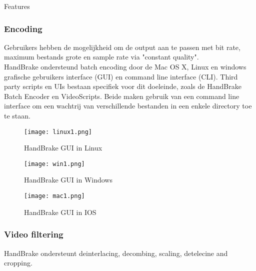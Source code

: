 \begin{subsectionbox}{Features}\end{subsectionbox}
\subsubsection{Encoding}

Gebruikers hebben de mogelijkheid om de output aan te passen met bit rate, maximum bestands grote en sample rate via "constant quality".\\

HandBrake ondersteund batch encoding door de Mac OS X, Linux en windows grafische gebruikers interface (GUI) en command line interface (CLI). Third party scripts en UIs bestaan specifiek voor dit doeleinde, zoals de HandBrake Batch Encoder en VideoScripts. Beide maken gebruik van een command line interface om een wachtrij van verschillende bestanden in een enkele directory toe te staan.

\begin{figure}[!hp]
\centering
\texttt{[image: linux1.png]}
\caption{HandBrake GUI in Linux}
\end{figure}
\newpage
\begin{figure}[!hp]
\centering
\texttt{[image: win1.png]}
\caption{HandBrake GUI in Windows}
\end{figure}
\begin{figure}[!h]
\centering
\texttt{[image: mac1.png]}
\caption{HandBrake GUI in IOS}
\end{figure}
\newpage

\subsubsection{Video filtering}

HandBrake ondersteunt deinterlacing, decombing, scaling, detelecine and cropping.

